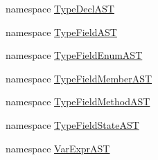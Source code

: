 \begin{DoxyCompactItemize}
namespace \hyperlink{namespaceslicc_1_1ast_1_1TypeDeclAST}{TypeDeclAST}
\item 
namespace \hyperlink{namespaceslicc_1_1ast_1_1TypeFieldAST}{TypeFieldAST}
\item 
namespace \hyperlink{namespaceslicc_1_1ast_1_1TypeFieldEnumAST}{TypeFieldEnumAST}
\item 
namespace \hyperlink{namespaceslicc_1_1ast_1_1TypeFieldMemberAST}{TypeFieldMemberAST}
\item 
namespace \hyperlink{namespaceslicc_1_1ast_1_1TypeFieldMethodAST}{TypeFieldMethodAST}
\item 
namespace \hyperlink{namespaceslicc_1_1ast_1_1TypeFieldStateAST}{TypeFieldStateAST}
\item 
namespace \hyperlink{namespaceslicc_1_1ast_1_1VarExprAST}{VarExprAST}
\end{DoxyCompactItemize}
